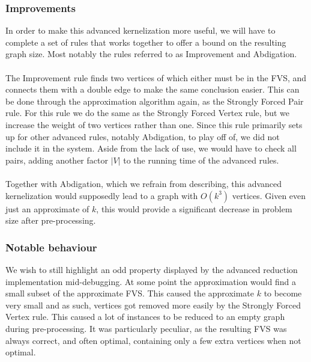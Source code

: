 \subsubsection{Improvements}
In order to make this advanced kernelization more useful, we will have to complete a set of rules that works together to offer a bound on the resulting graph size. Most notably the rules referred to as Improvement and Abdigation. \\\\
The Improvement rule finds two vertices of which either must be in the FVS, and connects them with a double edge to make the same conclusion easier. This can be done through the approximation algorithm again, as the Strongly Forced Pair rule. For this rule we do the same as the Strongly Forced Vertex rule, but we increase the weight of two vertices rather than one. Since this rule primarily sets up for other advanced rules, notably Abdigation, to play off of, we did not include it in the system. Aside from the lack of use, we would have to check all pairs, adding another factor $|V|$ to the running time of the advanced rules.\\\\
Together with Abdigation, which we refrain from describing, this advanced kernelization would supposedly lead to a graph with $O(k^3)$ vertices. Given even just an approximate of $k$, this would provide a significant decrease in problem size after pre-processing.
\subsubsection{Notable behaviour}
We wish to still highlight an odd property displayed by the advanced reduction implementation mid-debugging. At some point the approximation would find a small subset of the approximate FVS. This caused the approximate $k$ to become very small and as such, vertices got removed more easily by the Strongly Forced Vertex rule. This caused a lot of instances to be reduced to an empty graph during pre-processing. It was particularly peculiar, as the resulting FVS was always correct, and often optimal, containing only a few extra vertices when not optimal.